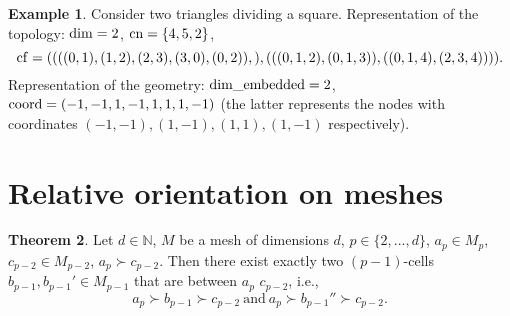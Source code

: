 \documentclass[fleqn]{article}
\theoremstyle{definition}
\newtheorem{theorem}{Theorem}[section]
\newtheorem{example}[theorem]{Example}
\begin{document}
\begin{example}
  Consider two triangles dividing a square.
  Representation of the topology: ${\rm dim} = 2$, ${\rm cn} = \{4, 5, 2\}$,
  \begin{equation}
    {\rm cf} =
    (
      (
        ((0, 1), (1, 2), (2, 3), (3, 0), (0, 2)),
      ),
      (
        ((0, 1, 2), (0, 1, 3)),
        ((0, 1, 4), (2, 3, 4))
      )
    ).
  \end{equation}
  Representation of the geometry: ${\rm dim\_embedded} = 2$,
  ${\rm coord} = (-1, -1, 1, -1, 1, 1, 1, -1)$
  (the latter represents the nodes with coordinates
  $(-1, -1), (1, -1), (1, 1), (1, -1)$ respectively).
\end{example}

\section{Relative orientation on meshes}

\begin{theorem}
  Let
    $d \in \mathbb{N}$,
    $M$ be a mesh of dimensions $d$,
    $p \in \{2, ..., d\}$,
    $a_p \in M_p$,
    $c_{p - 2} \in M_{p - 2}$,
    $a_p \succ c_{p - 2}$.
  Then there exist exactly two $(p - 1)$-cells
  $b_{p - 1}, b_{p - 1}' \in M_{p - 1}$
  that are between $a_p$ $c_{p - 2}$, i.e.,
  \begin{equation}
    a_p \succ b_{p - 1} \succ c_{p - 2}\ \text{and}\
    a_p \succ b_{p - 1}'' \succ c_{p - 2}.
  \end{equation}
\end{theorem}
\end{document}
